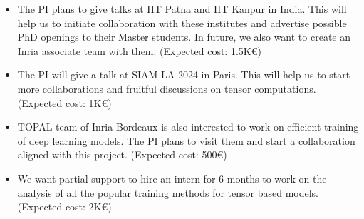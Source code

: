 \begin{itemize}
	\item The PI plans to give talks at IIT Patna and IIT Kanpur in India. This will help us to initiate collaboration with these institutes and advertise possible PhD openings to their Master students. In future, we also want to create an Inria associate team with them. (Expected cost: 1.5K\euro)

	\item The PI will give a talk at SIAM LA 2024 in Paris. This will help us to start more collaborations and fruitful discussions on tensor computations. (Expected cost: 1K\euro)
	
	\item TOPAL team of Inria Bordeaux is also interested to work on efficient training of deep learning models. The PI plans to visit them and start a collaboration aligned with this project. (Expected cost: 500\euro)
	
	\item We want partial support to hire an intern for $6$ months to work on the analysis of all the popular training methods for tensor based models. (Expected cost: 2K\euro)
\end{itemize} 


%




{\footnotesize }


